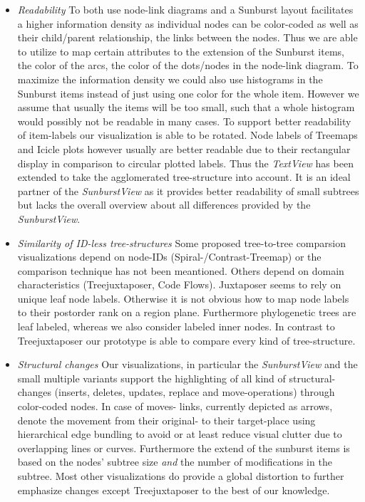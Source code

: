 \begin{itemize}
\item \emph{Readability} To both use node-link diagrams and a Sunburst layout facilitates a higher information density as individual nodes can be color-coded as well as their child/parent relationship, the links between the nodes. Thus we are able to utilize to map certain attributes to the extension of the Sunburst items, the color of the arcs, the color of the dots/nodes in the node-link diagram. To maximize the information density we could also use histograms in the Sunburst items instead of just using one color for the whole item. However we assume that usually the items will be too small, such that a whole histogram would possibly not be readable in many cases. To support better readability of item-labels our visualization is able to be rotated. Node labels of Treemaps and Icicle plots however usually are better readable due to their rectangular display in comparison to circular plotted labels. Thus the \emph{TextView} has been extended to take the agglomerated tree-structure into account. It is an ideal partner of the \emph{SunburstView} as it provides better readability of small subtrees but lacks the overall overview about all differences provided by the \emph{SunburstView}. 
\item \emph{Similarity of ID-less tree-structures} Some proposed tree-to-tree comparsion visualizations depend on node-IDs (Spiral-/Contrast-Treemap\cite{tu2007visualizing}) or the comparison technique has not been meantioned. Others depend on domain characteristics (Treejuxtaposer\cite{munzner2003treejuxtaposer}, Code Flows\cite{telea2008code}). Juxtaposer seems to rely on unique leaf node labels. Otherwise it is not obvious how to map node labels to their postorder rank on a region plane. Furthermore phylogenetic trees are leaf labeled, whereas we also consider labeled inner nodes. In contrast to Treejuxtaposer our prototype is able to compare every kind of tree-structure.
\item \emph{Structural changes} Our visualizations, in particular the \emph{SunburstView} and the small multiple variants support the highlighting of all kind of structural-changes (inserts, deletes, updates, replace and move-operations) through color-coded nodes. In case of moves- links, currently depicted as arrows, denote the movement from their original- to their target-place using hierarchical edge bundling to avoid or at least reduce visual clutter due to overlapping lines or curves. Furthermore the extend of the sunburst items is based on the nodes' subtree size \emph{and} the number of modifications in the subtree. Most other visualizations do provide a global distortion to further emphasize changes except Treejuxtaposer to the best of our knowledge.

\end{itemize}
